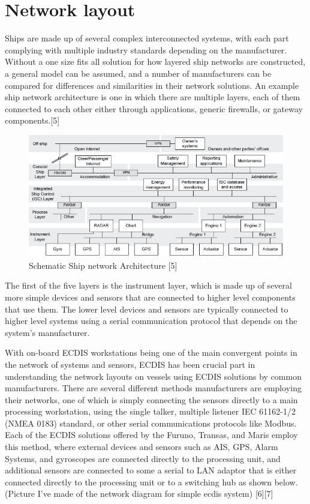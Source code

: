 \documentclass{article}
\begin{document}
\section{Network layout}
Ships are made up of several complex interconnected systems, with each part complying with multiple industry standards depending on the manufacturer. Without a one size fits all solution for how layered ship networks are constructed, a general model can be assumed, and a number of manufacturers can be compared for differences and similarities in their network solutions. An example ship network architecture is one in which there are multiple layers, each of them connected to each other either through applications, generic firewalls, or gateway components.[5] 
\begin{figure}[h]
    \centering
    \includegraphics[width=12cm]{Images and Figures/isc-arch.jpg}
    \caption{Schematic Ship network Architecture [5]}
    \label{fig:network}
\end{figure}

The first of the five layers is the instrument layer, which is made up of several more simple devices and sensors that are connected to higher level components that use them. The lower level devices and sensors are typically connected to higher level systems using a serial communication protocol that depends on the system's manufacturer. 

With on-board ECDIS workstations being one of the main convergent points in the network of systems and sensors, ECDIS has been crucial part in understanding the network layouts on vessels using ECDIS solutions by common manufacturers. There are several different methods manufacturers are employing their networks, one of which is simply connecting the sensors directly to a main processing workstation, using the single talker, multiple listener IEC 61162-1/2 (NMEA 0183) standard, or other serial communications protocols like Modbus. Each of the ECDIS solutions offered by the Furuno, Transas, and Maris employ this method, where external devices and sensors such as AIS, GPS, Alarm Systems, and gyroscopes are connected directly to the processing unit, and additional sensors are connected to some a serial to LAN adaptor that is either connected directly to the processing unit or to a switching hub as shown below.
(Picture I've made of the network diagram for simple ecdis system)
[6][7]
\end{document}
